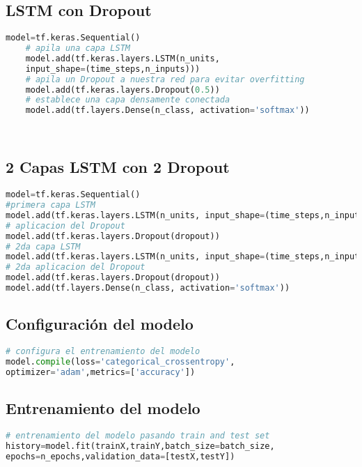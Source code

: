 \subsection{LSTM con Dropout}\label{LSTMCODEDROP}

\begin{center}
	\begin{lstlisting}[language=Python,caption=Modelo LSTM,captionpos=b,xleftmargin=.05\textwidth]
	model=tf.keras.Sequential()
	# apila una capa LSTM
	model.add(tf.keras.layers.LSTM(n_units,
	input_shape=(time_steps,n_inputs)))
	# apila un Dropout a nuestra red para evitar overfitting
	model.add(tf.keras.layers.Dropout(0.5))
	# establece una capa densamente conectada
	model.add(tf.layers.Dense(n_class, activation='softmax'))
	
	
	\end{lstlisting}
\end{center}
\subsection{2 Capas LSTM con 2 Dropout}\label{2LSTM2DROPCODE}
\begin{center}
	\begin{lstlisting}[language=Python,caption=Modelo 2 capas LSTM y 2 dropout,captionpos=b,xleftmargin=.05\textwidth]
model=tf.keras.Sequential()
#primera capa LSTM
model.add(tf.keras.layers.LSTM(n_units, input_shape=(time_steps,n_inputs),return_sequences=True))
# aplicacion del Dropout
model.add(tf.keras.layers.Dropout(dropout))
# 2da capa LSTM
model.add(tf.keras.layers.LSTM(n_units, input_shape=(time_steps,n_inputs)))
# 2da aplicacion del Dropout
model.add(tf.keras.layers.Dropout(dropout))
model.add(tf.layers.Dense(n_class, activation='softmax'))
	\end{lstlisting}
\end{center}
\subsection{Configuración del modelo}\label{configmodel}
\begin{lstlisting}[language=Python,caption=Parámetros para el entrenamiento del modelo,captionpos=b,xleftmargin=.05\textwidth]
# configura el entrenamiento del modelo
model.compile(loss='categorical_crossentropy',
optimizer='adam',metrics=['accuracy'])
\end{lstlisting}
\subsection{Entrenamiento del modelo}\label{trainingmodel}
\begin{lstlisting}[language=Python,caption=Entrenamiento del modelo,captionpos=b,xleftmargin=.05\textwidth]
# entrenamiento del modelo pasando train and test set
history=model.fit(trainX,trainY,batch_size=batch_size,
epochs=n_epochs,validation_data=[testX,testY])
\end{lstlisting}



